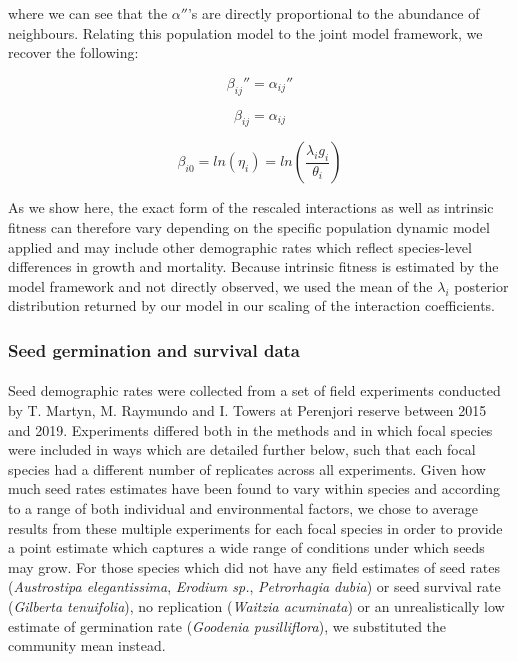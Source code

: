 \documentclass[a4,12pt]{article}
\begin{document}
        where we can see that the ${\alpha}''$'s are directly proportional to the abundance of neighbours. Relating this population model to the joint model framework, we recover the following: 

        \begin{equation}
        {\beta_{ij}}'' = {\alpha_{ij}}''
        \end{equation}

        \begin{equation}
        \beta_{ij} = \alpha_{ij}
        \end{equation}

        \begin{equation}
        \beta_{i0}  = ln(\eta_{i}) = ln(\frac{\lambda_{i} g_{i}}{\theta_{i}})
        \end{equation}


        As we show here, the exact form of the rescaled interactions as well as intrinsic fitness can therefore vary depending on the specific population dynamic model applied and may include other demographic rates which reflect species-level differences in growth and mortality. Because intrinsic fitness is estimated by the model framework and not directly observed, we used the mean of the $\lambda_{i}$ posterior distribution returned by our model in our scaling of the interaction coefficients.


        \subsubsection{Seed germination and survival data}
        \label{SI:germination}

        \paragraph{}
        Seed demographic rates were collected from a set of field experiments conducted by T. Martyn, M. Raymundo and I. Towers at Perenjori reserve between 2015 and 2019. Experiments differed both in the methods and in which focal species were included in ways which are detailed further below, such that each focal species had a different number of replicates across all experiments. Given how much seed rates estimates have been found to vary within species and according to a range of both individual and environmental factors, we chose to average results from these multiple experiments for each focal species in order to provide a point estimate which captures a wide range of conditions under which seeds may grow. For those species which did not have any field estimates of seed rates (\textit{Austrostipa elegantissima}, \textit{Erodium sp.}, \textit{Petrorhagia dubia}) or seed survival rate (\textit{Gilberta tenuifolia}), no replication (\textit{Waitzia acuminata}) or an unrealistically low estimate of germination rate (\textit{Goodenia pusilliflora}), we substituted the community mean instead. 
\end{document}
